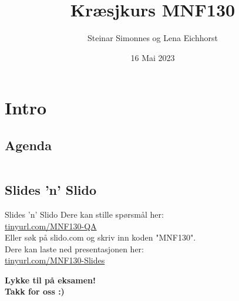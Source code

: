 \documentclass[aspectratio=169,fleqn,handout,xcolor={dvipsnames}]{beamer}
\author[ls]{Steinar Simonnes og Lena Eichhorst}
\title[sgp]{Kræsjkurs MNF130}
\institute{Institutt for Informatikk \\ Universitetet i Bergen}
\date[16.05.23]{16 Mai 2023}
\begin{document}
\begin{frame}[t,plain]
    \titlepage
\end{frame}

\section{Intro}
\subsection*{Agenda}
\begin{frame}
    \begin{columns}[t]
        \begin{column}{.5\textwidth}
            \tableofcontents[sections={1-5}]
        \end{column}
        \begin{column}{.5\textwidth}
            \tableofcontents[sections={6-}]
        \end{column}
    \end{columns}
\end{frame}

\subsection*{Slides 'n' Slido}
\begin{frame}{Slides 'n' Slido}
    Dere kan stille spørsmål her:\\
    \url{tinyurl.com/MNF130-QA}\\
    Eller søk på slido.com og skriv inn koden "MNF130".\\[3mm]
    Dere kan laste ned presentasjonen her:\\
    \url{tinyurl.com/MNF130-Slides}
\end{frame}


%
%
%
%
%
%



\begin{frame}
\begin{center}
\begin{Large}
\textbf{Lykke til på eksamen!\\[5mm]
Takk for oss :)}

\end{Large}
\end{center}  
\end{frame}
\end{document}
